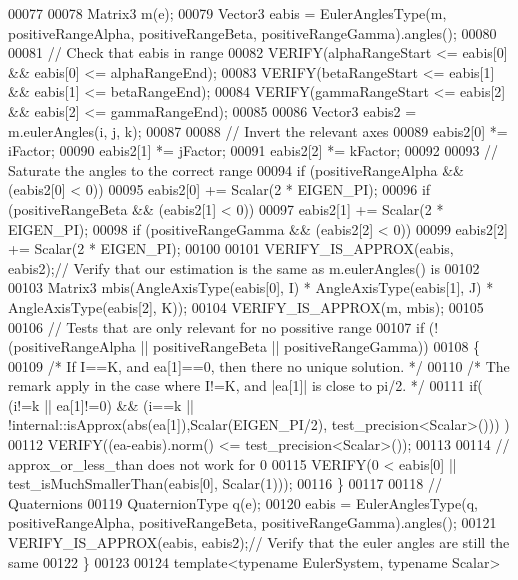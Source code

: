 \begin{DoxyCode}
00077   
00078   Matrix3 m(e);
00079   Vector3 eabis = EulerAnglesType(m, positiveRangeAlpha, positiveRangeBeta, positiveRangeGamma).angles();
00080   
00081   \textcolor{comment}{// Check that eabis in range}
00082   VERIFY(alphaRangeStart <= eabis[0] && eabis[0] <= alphaRangeEnd);
00083   VERIFY(betaRangeStart <= eabis[1] && eabis[1] <= betaRangeEnd);
00084   VERIFY(gammaRangeStart <= eabis[2] && eabis[2] <= gammaRangeEnd);
00085   
00086   Vector3 eabis2 = m.eulerAngles(i, j, k);
00087   
00088   \textcolor{comment}{// Invert the relevant axes}
00089   eabis2[0] *= iFactor;
00090   eabis2[1] *= jFactor;
00091   eabis2[2] *= kFactor;
00092   
00093   \textcolor{comment}{// Saturate the angles to the correct range}
00094   \textcolor{keywordflow}{if} (positiveRangeAlpha && (eabis2[0] < 0))
00095     eabis2[0] += Scalar(2 * EIGEN\_PI);
00096   \textcolor{keywordflow}{if} (positiveRangeBeta && (eabis2[1] < 0))
00097     eabis2[1] += Scalar(2 * EIGEN\_PI);
00098   \textcolor{keywordflow}{if} (positiveRangeGamma && (eabis2[2] < 0))
00099     eabis2[2] += Scalar(2 * EIGEN\_PI);
00100   
00101   VERIFY\_IS\_APPROX(eabis, eabis2);\textcolor{comment}{// Verify that our estimation is the same as m.eulerAngles() is}
00102   
00103   Matrix3 mbis(AngleAxisType(eabis[0], I) * AngleAxisType(eabis[1], J) * AngleAxisType(eabis[2], K));
00104   VERIFY\_IS\_APPROX(m,  mbis);
00105   
00106   \textcolor{comment}{// Tests that are only relevant for no possitive range}
00107   \textcolor{keywordflow}{if} (!(positiveRangeAlpha || positiveRangeBeta || positiveRangeGamma))
00108   \{
00109     \textcolor{comment}{/* If I==K, and ea[1]==0, then there no unique solution. */} 
00110     \textcolor{comment}{/* The remark apply in the case where I!=K, and |ea[1]| is close to pi/2. */} 
00111     \textcolor{keywordflow}{if}( (i!=k || ea[1]!=0) && (i==k || !internal::isApprox(abs(ea[1]),Scalar(EIGEN\_PI/2),
      test\_precision<Scalar>())) ) 
00112       VERIFY((ea-eabis).norm() <= test\_precision<Scalar>());
00113     
00114     \textcolor{comment}{// approx\_or\_less\_than does not work for 0}
00115     VERIFY(0 < eabis[0] || test\_isMuchSmallerThan(eabis[0], Scalar(1)));
00116   \}
00117   
00118   \textcolor{comment}{// Quaternions}
00119   QuaternionType q(e);
00120   eabis = EulerAnglesType(q, positiveRangeAlpha, positiveRangeBeta, positiveRangeGamma).angles();
00121   VERIFY\_IS\_APPROX(eabis, eabis2);\textcolor{comment}{// Verify that the euler angles are still the same}
00122 \}
00123 
00124 \textcolor{keyword}{template}<\textcolor{keyword}{typename} EulerSystem, \textcolor{keyword}{typename} Scalar>

\end{DoxyCode}
